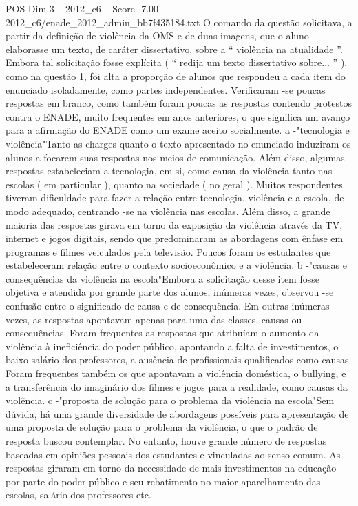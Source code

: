 \begin{textsample}{POS Dim 3 – 2012\_c6 – Score -7.00 – 2012\_c6/enade\_2012\_admin\_bb7f435184.txt}
O comando da questão solicitava, a partir da definição de violência da OMS e de duas imagens, que o aluno elaborasse um texto, de caráter dissertativo, sobre a “ violência na atualidade ”.
Embora tal solicitação fosse explícita ( “ redija um texto dissertativo sobre... ” ), como na questão 1, foi alta a proporção de alunos que respondeu a cada item do enunciado isoladamente, como partes independentes.
Verificaram -se poucas respostas em branco, como também foram poucas as respostas contendo protestos contra o ENADE, muito frequentes em anos anteriores, o que significa um avanço para a afirmação do ENADE como um exame aceito socialmente. a -"tecnologia e violência"Tanto as charges quanto o texto apresentado no enunciado induziram os alunos a focarem suas respostas nos meios de comunicação.
Além disso, algumas respostas estabeleciam a tecnologia, em si, como causa da violência tanto nas escolas ( em particular ), quanto na sociedade ( no geral ).
Muitos respondentes tiveram dificuldade para fazer a relação entre tecnologia, violência e a escola, de modo adequado, centrando -se na violência nas escolas.
Além disso, a grande maioria das respostas girava em torno da exposição da violência através da TV, internet e jogos digitais, sendo que predominaram as abordagens com ênfase em programas e filmes veiculados pela televisão.
Poucos foram os estudantes que estabeleceram relação entre o contexto socioeconômico e a violência. b -"causas e consequências da violência na escola"Embora a solicitação desse item fosse objetiva e atendida por grande parte dos alunos, inúmeras vezes, observou -se confusão entre o significado de causa e de consequência.
Em outras inúmeras vezes, as respostas apontavam apenas para uma das classes, causas ou consequências.
Foram frequentes as respostas que atribuíam o aumento da violência à ineficiência do poder público, apontando a falta de investimentos, o baixo salário dos professores, a ausência de profissionais qualificados como causas.
Foram frequentes também os que apontavam a violência doméstica, o bullying, e a transferência do imaginário dos filmes e jogos para a realidade, como causas da violência. c -"proposta de solução para o problema da violência na escola"Sem dúvida, há uma grande diversidade de abordagens possíveis para apresentação de uma proposta de solução para o problema da violência, o que o padrão de resposta buscou contemplar.
No entanto, houve grande número de respostas baseadas em opiniões pessoais dos estudantes e vinculadas ao senso comum.
As respostas giraram em torno da necessidade de mais investimentos na educação por parte do poder público e seu rebatimento no maior aparelhamento das escolas, salário dos professores etc.

\end{textsample}
